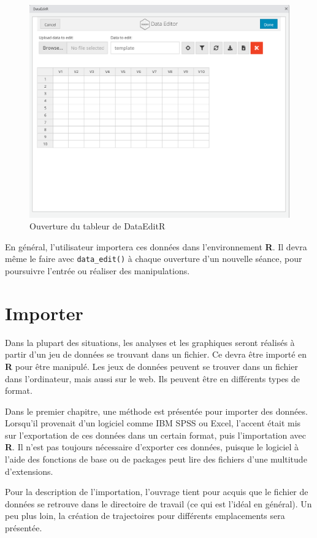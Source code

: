 \documentclass[
]{book}
\begin{document}
\begin{figure}

{\centering \includegraphics[width=0.75\linewidth]{image//editR} 

}

\caption{Ouverture du tableur de DataEditR}\label{fig:editr}
\end{figure}

En général, l'utilisateur importera ces données dans l'environnement \textbf{R}. Il devra même le faire avec \texttt{data\_edit()} à chaque ouverture d'un nouvelle séance, pour poursuivre l'entrée ou réaliser des manipulations.

\hypertarget{importer}{%
\chapter{Importer}\label{importer}}

Dans la plupart des situations, les analyses et les graphiques seront réalisés à partir d'un jeu de données se trouvant dans un fichier. Ce devra être importé en \textbf{R} pour être manipulé. Les jeux de données peuvent se trouver dans un fichier dans l'ordinateur, mais aussi sur le web. Ils peuvent être en différents types de format.

Dans le premier chapitre, une méthode est présentée pour importer des données. Lorsqu'il provenait d'un logiciel comme IBM SPSS ou Excel, l'accent était mis sur l'exportation de ces données dans un certain format, puis l'importation avec \textbf{R}. Il n'est pas toujours nécessaire d'exporter ces données, puisque le logiciel à l'aide des fonctions de base ou de packages peut lire des fichiers d'une multitude d'extensions.

Pour la description de l'importation, l'ouvrage tient pour acquis que le fichier de données se retrouve dans le directoire de travail (ce qui est l'idéal en général). Un peu plus loin, la création de trajectoires pour différents emplacements sera présentée.
\end{document}

